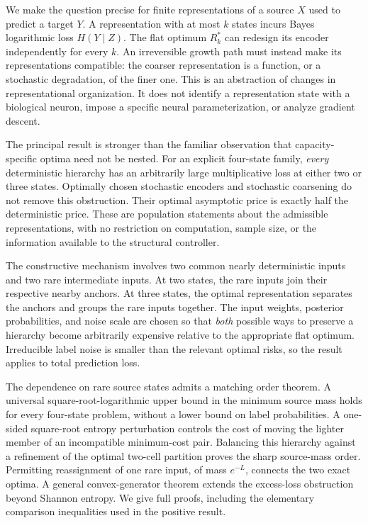 \documentclass[11pt]{article}
\theoremstyle{remark}\newtheorem{remark}[theorem]{Remark}
\begin{document}
We make the question precise for finite representations of a source $X$
used to predict a target $Y$. A representation with at most $k$ states incurs
Bayes logarithmic loss $H(Y\mid Z)$. The flat optimum $R_k^*$ can redesign
its encoder independently for every $k$. An irreversible growth path must
instead make its representations compatible: the coarser representation is
a function, or a stochastic degradation, of the finer one. This is an
abstraction of changes in representational organization. It does not
identify a representation state with a biological neuron, impose a specific
neural parameterization, or analyze gradient descent.

The principal result is stronger than the familiar observation that
capacity-specific optima need not be nested. For an explicit four-state
family, \emph{every} deterministic hierarchy has an arbitrarily large
multiplicative loss at either two or three states. Optimally chosen stochastic
encoders and stochastic coarsening do not remove this obstruction. Their
optimal asymptotic price is exactly half the deterministic price. These are
population statements about the admissible representations, with no
restriction on computation, sample size, or the information available to the
structural controller.

The constructive mechanism involves two common nearly deterministic inputs
and two rare intermediate inputs. At two states, the rare inputs join their
respective nearby anchors. At three states, the optimal representation
separates the anchors and groups the rare inputs together. The input weights,
posterior probabilities, and noise scale are chosen so that \emph{both}
possible ways to preserve a hierarchy become arbitrarily expensive relative
to the appropriate flat optimum. Irreducible label noise is smaller than the
relevant optimal risks, so the result applies to total prediction loss.

The dependence on rare source states admits a matching order theorem.
A universal square-root-logarithmic upper bound in the minimum source
mass holds for every four-state problem, without a lower bound on label
probabilities. A one-sided square-root entropy perturbation controls the
cost of moving the lighter member of an incompatible minimum-cost pair.
Balancing this hierarchy against a refinement of the optimal two-cell
partition proves the sharp source-mass order. Permitting reassignment of
one rare input, of mass $e^{-L}$, connects the two exact optima. A general
convex-generator theorem extends the excess-loss obstruction beyond Shannon
entropy. We give full proofs, including the elementary comparison inequalities
used in the positive result.
\end{document}

